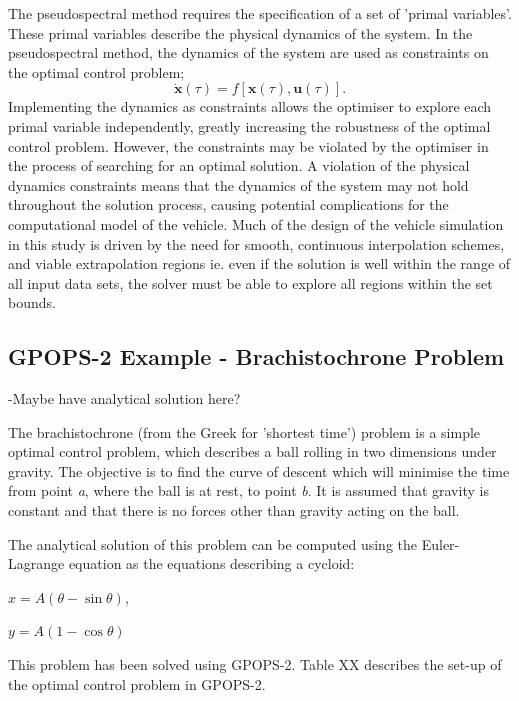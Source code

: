 The pseudospectral method requires the specification of a set of 'primal variables'. These primal variables describe the physical dynamics of the system. In the pseudospectral method, the dynamics of the system are used as constraints on the optimal control problem;
\begin{equation} \label{eq:state2}
\dot{\textbf{x}}(\tau) = f[\textbf{x}(\tau),\textbf{u}(\tau)].
\end{equation}
Implementing the dynamics as constraints allows the optimiser to explore each primal variable independently, greatly increasing the robustness of the optimal control problem. However, the constraints may be violated by the optimiser in the process of searching for an optimal solution. A violation of the physical dynamics constraints means that the dynamics of the system may not hold throughout the solution process, causing potential complications for the computational model of the vehicle. Much of the design of the vehicle simulation in this study is driven by the need for smooth, continuous interpolation schemes, and viable extrapolation regions ie. even if the solution is well within the range of all input data sets, the solver must be able to explore all regions within the set bounds. 

\subsection{GPOPS-2 Example - Brachistochrone Problem}

-Maybe have analytical solution here?

The brachistochrone (from the Greek for 'shortest time') problem is a simple optimal control problem, which describes a ball rolling in two dimensions under gravity. The objective is to find the curve of descent which will minimise the time from point \textit{a}, where the ball is at rest, to point \textit{b}. It is assumed that gravity is constant and that there is no forces other than gravity acting on the ball. 

The analytical solution of this problem can be computed using the Euler-Lagrange equation as the equations describing a cycloid:

$x = A(\theta - \sin\theta) $,

$y=A(1 - \cos\theta)$

This problem has been solved using GPOPS-2. Table XX describes the set-up of the optimal control problem in GPOPS-2. 

